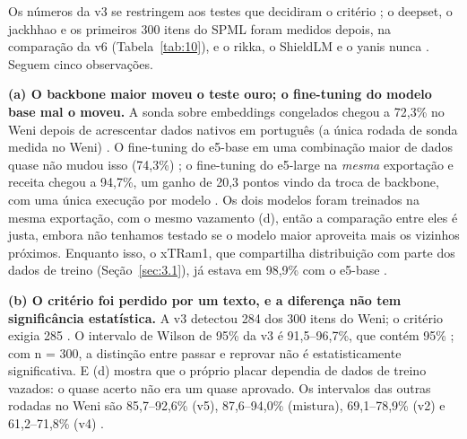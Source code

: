 \documentclass[11pt]{article}
\begin{document}
Os números da v3 se restringem aos testes que decidiram o critério%
; o deepset, o jackhhao e os primeiros 300 itens do SPML foram medidos depois, na comparação da v6 (Tabela~\ref{tab:10}), e o rikka, o ShieldLM e o yanis nunca%
. Seguem cinco observações.

\textbf{(a) O backbone maior moveu o teste ouro; o fine-tuning do modelo base mal o moveu.} A sonda sobre embeddings congelados chegou a 72,3\% no Weni depois de acrescentar dados nativos em português (a única rodada de sonda medida no Weni)%
. O fine-tuning do e5-base em uma combinação maior de dados quase não mudou isso (74,3\%)%
; o fine-tuning do e5-large na \emph{mesma} exportação e receita chegou a 94,7\%, um ganho de 20,3 pontos vindo da troca de backbone, com uma única execução por modelo%
. Os dois modelos foram treinados na mesma exportação, com o mesmo vazamento (d), então a comparação entre eles é justa, embora não tenhamos testado se o modelo maior aproveita mais os vizinhos próximos. Enquanto isso, o xTRam1, que compartilha distribuição com parte dos dados de treino (Seção~\ref{sec:3.1}), já estava em 98,9\% com o e5-base%
.

\textbf{(b) O critério foi perdido por um texto, e a diferença não tem significância estatística.} A v3 detectou 284 dos 300 itens do Weni; o critério exigia 285%
. O intervalo de Wilson de 95\% \citep{wilson1927probable} da v3 é 91,5–96,7\%, que contém 95\%%
; com n = 300, a distinção entre passar e reprovar não é estatisticamente significativa. E (d) mostra que o próprio placar dependia de dados de treino vazados: o quase acerto não era um quase aprovado. Os intervalos das outras rodadas no Weni são 85,7–92,6\% (v5), 87,6–94,0\% (mistura), 69,1–78,9\% (v2) e 61,2–71,8\% (v4)%
.
\end{document}
